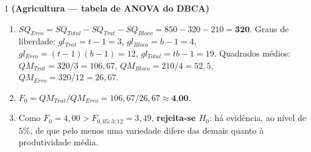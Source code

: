 \documentclass[11pt]{article}
\begin{document}

\begin{questao}{1} \textbf{(Agricultura --- tabela de ANOVA do DBCA)}
\end{questao}
\begin{solucao}
\begin{enumerate}[label=(\alph*)]
  \item $SQ_{Erro} = SQ_{Total}-SQ_{Trat}-SQ_{Bloco} = 850-320-210 = \textbf{320}$.
    Graus de liberdade: $gl_{Trat}=t-1=3$, $gl_{Bloco}=b-1=4$, $gl_{Erro}=(t-1)(b-1)=12$,
    $gl_{Total}=tb-1=19$. Quadrados médios: $QM_{Trat}=320/3=106{,}67$,
    $QM_{Bloco}=210/4=52{,}5$, $QM_{Erro}=320/12=26{,}67$.
  \item $F_0 = QM_{Trat}/QM_{Erro} = 106{,}67/26{,}67 \approx \textbf{4{,}00}$.
  \item Como $F_0=4{,}00 > F_{0{,}05;3;12}=3{,}49$, \textbf{rejeita-se $H_0$}: há evidência, ao
    nível de $5\%$, de que pelo menos uma variedade difere das demais quanto à produtividade
    média.
\end{enumerate}
\end{solucao}
\end{document}
